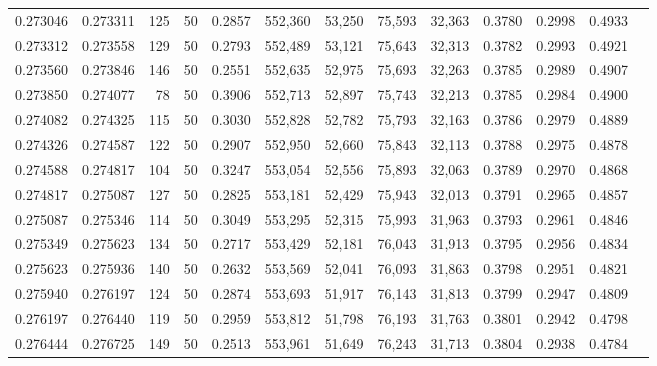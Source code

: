 \begin{tabular}{rrrrrrrrrrrrr}
0.273046 & 0.273311 &   125 &  50 &                                     0.2857 & 552,360 &  53,250 &  75,593 &  32,363 & 0.3780 & 0.2998 & 0.4933 \\
0.273312 & 0.273558 &   129 &  50 &                                     0.2793 & 552,489 &  53,121 &  75,643 &  32,313 & 0.3782 & 0.2993 & 0.4921 \\
0.273560 & 0.273846 &   146 &  50 &                                     0.2551 & 552,635 &  52,975 &  75,693 &  32,263 & 0.3785 & 0.2989 & 0.4907 \\
0.273850 & 0.274077 &    78 &  50 &                                     0.3906 & 552,713 &  52,897 &  75,743 &  32,213 & 0.3785 & 0.2984 & 0.4900 \\
0.274082 & 0.274325 &   115 &  50 &                                     0.3030 & 552,828 &  52,782 &  75,793 &  32,163 & 0.3786 & 0.2979 & 0.4889 \\
0.274326 & 0.274587 &   122 &  50 &                                     0.2907 & 552,950 &  52,660 &  75,843 &  32,113 & 0.3788 & 0.2975 & 0.4878 \\
0.274588 & 0.274817 &   104 &  50 &                                     0.3247 & 553,054 &  52,556 &  75,893 &  32,063 & 0.3789 & 0.2970 & 0.4868 \\
0.274817 & 0.275087 &   127 &  50 &                                     0.2825 & 553,181 &  52,429 &  75,943 &  32,013 & 0.3791 & 0.2965 & 0.4857 \\
0.275087 & 0.275346 &   114 &  50 &                                     0.3049 & 553,295 &  52,315 &  75,993 &  31,963 & 0.3793 & 0.2961 & 0.4846 \\
0.275349 & 0.275623 &   134 &  50 &                                     0.2717 & 553,429 &  52,181 &  76,043 &  31,913 & 0.3795 & 0.2956 & 0.4834 \\
0.275623 & 0.275936 &   140 &  50 &                                     0.2632 & 553,569 &  52,041 &  76,093 &  31,863 & 0.3798 & 0.2951 & 0.4821 \\
0.275940 & 0.276197 &   124 &  50 &                                     0.2874 & 553,693 &  51,917 &  76,143 &  31,813 & 0.3799 & 0.2947 & 0.4809 \\
0.276197 & 0.276440 &   119 &  50 &                                     0.2959 & 553,812 &  51,798 &  76,193 &  31,763 & 0.3801 & 0.2942 & 0.4798 \\
0.276444 & 0.276725 &   149 &  50 &                                     0.2513 & 553,961 &  51,649 &  76,243 &  31,713 & 0.3804 & 0.2938 & 0.4784 \\

\end{tabular}
